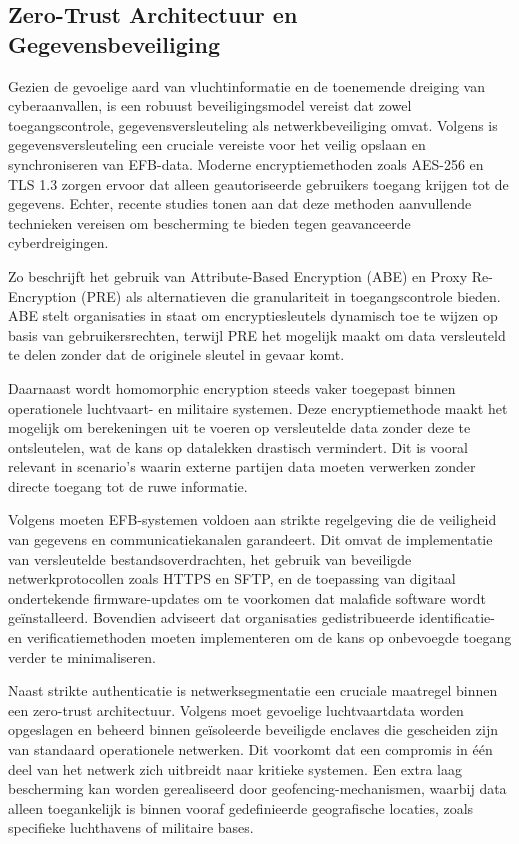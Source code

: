 \subsection{Zero-Trust Architectuur en Gegevensbeveiliging}

Gezien de gevoelige aard van vluchtinformatie en de toenemende dreiging van cyberaanvallen, is een robuust beveiligingsmodel vereist dat zowel toegangscontrole, gegevensversleuteling als netwerkbeveiliging omvat. Volgens \textcite{NISTFIPS140} is gegevensversleuteling een cruciale vereiste voor het veilig opslaan en synchroniseren van EFB-data. Moderne encryptiemethoden zoals AES-256 en TLS 1.3 zorgen ervoor dat alleen geautoriseerde gebruikers toegang krijgen tot de gegevens. Echter, recente studies tonen aan dat deze methoden aanvullende technieken vereisen om bescherming te bieden tegen geavanceerde cyberdreigingen.

Zo beschrijft \textcite{VinayakBhuvi} het gebruik van Attribute-Based Encryption (ABE) en Proxy Re-Encryption (PRE) als alternatieven die granulariteit in toegangscontrole bieden. ABE stelt organisaties in staat om encryptiesleutels dynamisch toe te wijzen op basis van gebruikersrechten, terwijl PRE het mogelijk maakt om data versleuteld te delen zonder dat de originele sleutel in gevaar komt.

Daarnaast wordt homomorphic encryption steeds vaker toegepast binnen operationele luchtvaart- en militaire systemen. Deze encryptiemethode maakt het mogelijk om berekeningen uit te voeren op versleutelde data zonder deze te ontsleutelen, wat de kans op datalekken drastisch vermindert. Dit is vooral relevant in scenario’s waarin externe partijen data moeten verwerken zonder directe toegang tot de ruwe informatie.

Volgens \textcite{FAA_AC91-78A} moeten EFB-systemen voldoen aan strikte regelgeving die de veiligheid van gegevens en communicatiekanalen garandeert. Dit omvat de implementatie van versleutelde bestandsoverdrachten, het gebruik van beveiligde netwerkprotocollen zoals HTTPS en SFTP, en de toepassing van digitaal ondertekende firmware-updates om te voorkomen dat malafide software wordt geïnstalleerd. Bovendien adviseert \textcite{SkybraryEFB} dat organisaties gedistribueerde identificatie- en verificatiemethoden moeten implementeren om de kans op onbevoegde toegang verder te minimaliseren.

Naast strikte authenticatie is netwerksegmentatie een cruciale maatregel binnen een zero-trust architectuur. Volgens \textcite{ACISAPGSECVEIL001} moet gevoelige luchtvaartdata worden opgeslagen en beheerd binnen geïsoleerde beveiligde enclaves die gescheiden zijn van standaard operationele netwerken. Dit voorkomt dat een compromis in één deel van het netwerk zich uitbreidt naar kritieke systemen. Een extra laag bescherming kan worden gerealiseerd door geofencing-mechanismen, waarbij data alleen toegankelijk is binnen vooraf gedefinieerde geografische locaties, zoals specifieke luchthavens of militaire bases.


